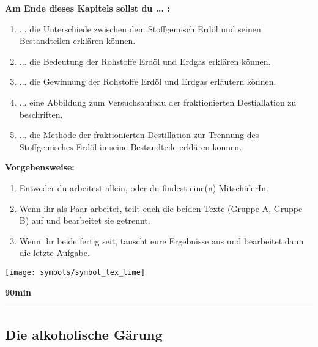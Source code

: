 \documentclass{scrartcl}  %
\begin{document}
			\begin{minipage}{0.7\textwidth}
				\noindent \textbf{Am Ende dieses Kapitels sollst du ... :}
				\begin{enumerate}
					\item ... die Unterschiede zwischen dem Stoffgemisch Erdöl und seinen Bestandteilen erklären können.
					\item ... die Bedeutung der Rohstoffe Erdöl und Erdgas erklären können.
					\item ... die Gewinnung der Rohstoffe Erdöl und Erdgas erläutern können.
					\item ... eine Abbildung zum Versuchsaufbau der fraktionierten Destiallation zu beschriften.
					\item ... die Methode der fraktionierten Destillation zur Trennung des Stoffgemisches Erdöl in seine Bestandteile erklären können.
				\end{enumerate}
				\textbf{Vorgehensweise:}
				\begin{enumerate}
					\item Entweder du arbeitest allein, oder du findest eine(n) MitschülerIn.
					\item Wenn ihr als Paar arbeitet, teilt euch die beiden Texte (Gruppe A, Gruppe B) auf und bearbeitet sie getrennt.
					\item Wenn ihr beide fertig seit, tauscht eure Ergebnisse aus und bearbeitet dann die letzte Aufgabe.
				\end{enumerate}
				
			\end{minipage}
			\hspace{0.1\textwidth}
			\begin{minipage}{0.2\textwidth}
				\begin{tcolorbox}
					[enhanced,
					width=0.9\textwidth,
					colback=white,
					colframe=black,
					fonttitle=\sffamily\bfseries\large, 
					title=Zeit,  %
					attach boxed title to top center={xshift=-0.0mm,yshift=-0.50mm},
					boxed title style={skin=enhancedfirst jigsaw,size=small,arc=1mm,bottom=-1mm,colframe=black,height=0.75cm},
					colbacktitle=black,
					drop lifted shadow]
					\centering
					\texttt{[image: symbols/symbol\_tex\_time]}
					
					\begin{center}
						\textbf{90min}
					\end{center}
				\end{tcolorbox}
			\end{minipage}
			
			\begin{center}
				\noindent\rule{18cm}{0.1pt}
			\end{center}
			
\newpage
			\subsection{Die alkoholische Gärung}
			
\end{document}
